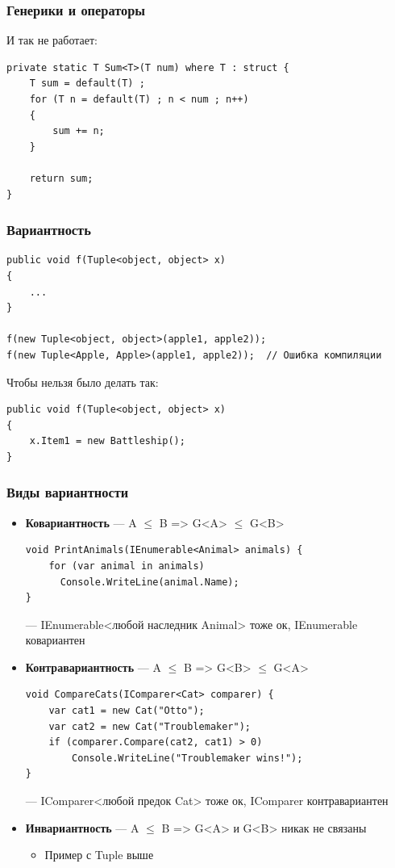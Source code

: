 \documentclass[xetex,mathserif,serif]{beamer}
\begin{document}
	\begin{frame}[fragile]
		\frametitle{Генерики и операторы}
		И так не работает:
		\begin{footnotesize}
			\begin{verbatim}
private static T Sum<T>(T num) where T : struct {
    T sum = default(T) ;
    for (T n = default(T) ; n < num ; n++)
    {
        sum += n;
    }

    return sum;
}
			\end{verbatim}
		\end{footnotesize}
	\end{frame}

	\begin{frame}[fragile]
		\frametitle{Вариантность}
		\begin{verbatim}
public void f(Tuple<object, object> x)
{
    ...
}

f(new Tuple<object, object>(apple1, apple2));
f(new Tuple<Apple, Apple>(apple1, apple2));  // Ошибка компиляции
		\end{verbatim}
		\vspace{3mm}
		Чтобы нельзя было делать так:
		\begin{verbatim}
public void f(Tuple<object, object> x)
{
    x.Item1 = new Battleship();
}
		\end{verbatim}
	\end{frame}

		\begin{frame}[fragile]
		\frametitle{Виды вариантности}
		\begin{footnotesize}
			\begin{itemize}
				\item \textbf{Ковариантность} --- A $\leq$ B => G<A> $\leq$ G<B>
				\begin{verbatim}
void PrintAnimals(IEnumerable<Animal> animals) {
    for (var animal in animals)
      Console.WriteLine(animal.Name);
}
				\end{verbatim}
				--- IEnumerable<любой наследник Animal> тоже ок, IEnumerable ковариантен
				\item \textbf{Контравариантность} --- A $\leq$ B => G<B> $\leq$ G<A>
				\begin{verbatim}
void CompareCats(IComparer<Cat> comparer) {
    var cat1 = new Cat("Otto");
    var cat2 = new Cat("Troublemaker");
    if (comparer.Compare(cat2, cat1) > 0) 
        Console.WriteLine("Troublemaker wins!");
}
				\end{verbatim}
				--- IComparer<любой предок Cat> тоже ок, IComparer контравариантен
				\item \textbf{Инвариантность} --- A $\leq$ B => G<A> и G<B> никак не связаны
				\begin{itemize}
					\item Пример с Tuple выше
				\end{itemize}
			\end{itemize}
		\end{footnotesize}
	\end{frame}
\end{document}
